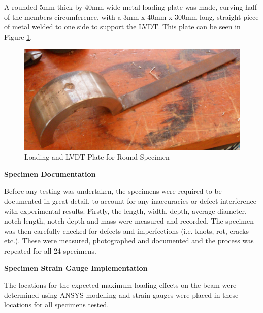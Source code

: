\documentclass[11pt,a4paper]{article}
\numberwithin{equation}{subsection}
\begin{document}
\noindent
A rounded 5mm thick by 40mm wide metal loading plate was made, curving half of the members circumference, with a 3mm x 40mm x 300mm long, straight piece of metal welded to one side to support the LVDT. This plate can be seen in Figure \ref{fig:RoundPlate}. 
\vspace*{\baselineskip}
\begin{figure}[h]
	\begin{center}
		\includegraphics[scale=0.1]{Round_Plate}
	\end{center}
	\caption{Loading and LVDT Plate for Round Specimen}
	\label{fig:RoundPlate}
\end{figure}
\pagebreak


\noindent
\textbf{Specimen Documentation}\par
\noindent
Before any testing was undertaken, the specimens were required to be documented in great detail, to account for any inaccuracies or defect interference with experimental results. Firstly, the length, width, depth, average diameter, notch length, notch depth and mass were measured and recorded. The specimen was then carefully checked for defects and imperfections (i.e. knots, rot, cracks etc.). These were measured, photographed and documented and the process was repeated for all 24 specimens. 

\vspace*{\baselineskip}

\noindent
\textbf{Specimen Strain Gauge Implementation}\par
\noindent
The locations for the expected maximum loading effects on the beam were determined using ANSYS modelling and strain gauges were placed in these locations for all specimens tested.
\end{document}
